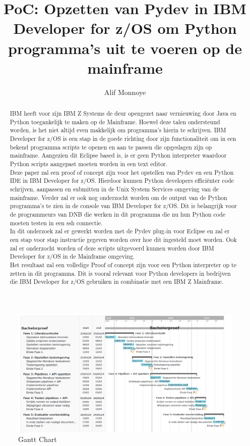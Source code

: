 \documentclass{hogent-article}
\title{PoC: Opzetten van Pydev in IBM Developer for z/OS om Python programma's uit te voeren op de mainframe}
\author{Alif Monnoye}
\begin{document}
\begin{abstract}
    IBM heeft voor zijn IBM Z Systems de deur opengezet naar vernieuwing door Java en Python toegankelijk te maken op de Mainframe. Hoewel deze talen ondersteund worden, is het niet altijd even makkelijk om programma's hierin te schrijven. IBM Developer for z/OS is een stap in de goede richting door zijn functionaliteit om in een bekend programma scripts te openen en aan te passen die opgeslagen zijn op mainframe. Aangezien dit Eclipse based is, is er geen Python interpreter waardoor Python scripts aangepast moeten worden in een text editor. \\
    Deze paper zal een proof of concept zijn voor het opstellen van Pydev en een Python IDE in IBM Developer for z/OS. Hierdoor kunnen Python developers efficiënter code schrijven, aanpassen en submitten in de Unix System Services omgeving van de mainframe. Verder zal er ook nog onderzocht worden om de output van de Python programma's te zien in de console van IBM Developer for z/OS. Dit is belangrijk voor de programmeurs van DNB die werken in dit programma die nu hun Python code moeten testen in een ssh connectie. \\
    In dit onderzoek zal er gewerkt worden met de Pydev plug-in voor Eclipse en zal er een stap voor stap instructie gegeven worden over hoe dit ingesteld moet worden. Ook zal er onderzocht worden of deze scripts uitgevoerd kunnen worden door IBM Developer for z/OS in de Mainframe omgeving. \\
    Het resultaat zal een volledige Proof of concept zijn voor een Python interpreter op te zetten in dit programma. Dit is vooral relevant voor Python developers in bedrijven die IBM Developer for z/OS gebruiken in combinatie met een IBM Z Mainframe. 
\end{abstract}

\tableofcontents



\printbibliography[heading=bibintoc]

\cleardoublepage
\begin{figure}[pt!]
    \centering
    \includegraphics[width=550pt]{GanttChart.png}
    \caption{Gantt Chart}
    \label{fig}
\end{figure}
\end{document}
